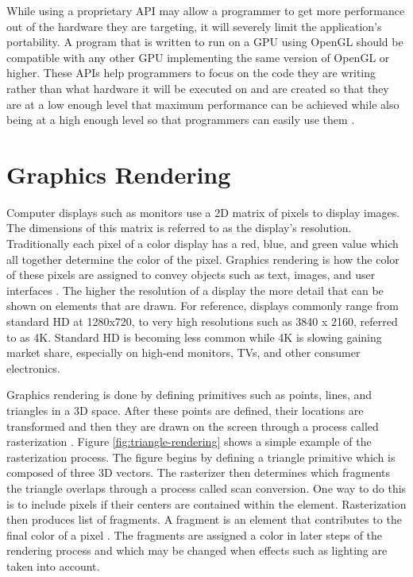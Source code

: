 \documentclass{article}
\begin{document}
While using a proprietary API may allow a programmer to get more performance out of the hardware they are targeting, it will severely limit the application's portability. A program that is written to run on a GPU using OpenGL should be compatible with any other GPU implementing the same version of OpenGL or higher. These APIs help programmers to focus on the code they are writing rather than what hardware it will be executed on and are created so that they are at a low enough level that maximum performance can be achieved while also being at a high enough level so that programmers can easily use them \cite[p.~4]{sellers2016}.

\section{Graphics Rendering}
Computer displays such as monitors use a 2D matrix of pixels to display images. The dimensions of this matrix is referred to as the display's resolution. Traditionally each pixel of a color display has a red, blue, and green value which all together determine the color of the pixel. Graphics rendering is how the color of these pixels are assigned to convey objects such as text, images, and user interfaces \cite{mckesson2018}. The higher the resolution of a display the more detail that can be shown on elements that are drawn. For reference, displays commonly range from standard HD at 1280x720, to very high resolutions such as 3840 x 2160, referred to as 4K. Standard HD is becoming less common while 4K is slowing gaining market share, especially on high-end monitors, TVs, and other consumer electronics.

Graphics rendering is done by defining primitives such as points, lines, and triangles in a 3D space. After these points are defined, their locations are transformed and then they are drawn on the screen through a process called rasterization \cite{mckesson2018}. Figure \ref{fig:triangle-rendering} shows a simple example of the rasterization process. The figure begins by defining a triangle primitive which is composed of three 3D vectors. The rasterizer then determines which fragments the triangle overlaps through a process called scan conversion. One way to do this is to include pixels if their centers are contained within the element. Rasterization then produces list of fragments. A fragment is an element that contributes to the final color of a pixel \cite{sellers2016}. The fragments are assigned a color in later steps of the rendering process and which may be changed when effects such as lighting are taken into account.
\end{document}
